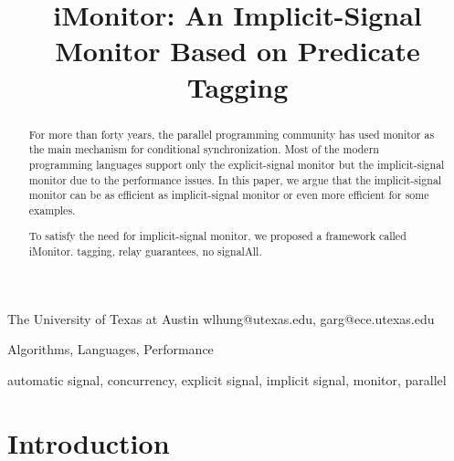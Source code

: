 \documentclass[preprint]{sigplanconf}
\begin{document}
\copyrightdata{[to be supplied]} 


\title{iMonitor: An Implicit-Signal Monitor Based on Predicate Tagging}
\subtitle{}

           {The University of Texas at Austin}
           {wlhung@utexas.edu, garg@ece.utexas.edu}

\maketitle

\begin{abstract}
For more than forty years, the parallel programming community has used monitor 
as the main mechanism for conditional synchronization. Most of the modern 
programming languages support only the explicit-signal monitor but the 
implicit-signal monitor due to the performance issues. In this paper, we 
argue that the implicit-signal monitor can be as efficient as implicit-signal
monitor or even more efficient for some examples.

To satisfy the need for implicit-signal monitor, we proposed a framework called 
iMonitor. tagging, relay guarantees, no signalAll. 

\end{abstract}


\terms
Algorithms, Languages, Performance 

\keywords
automatic signal, concurrency, explicit signal, implicit signal, monitor, 
parallel









\section{Introduction} \label{sec:intro}
\end{document}
